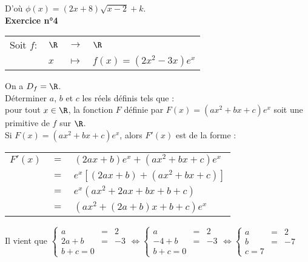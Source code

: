 \vspace*{.3cm}

D'où $\phi\left(x\right) = \left(2x+8\right)\sqrt{x-2} + k$. \\



\textbf{Exercice n°4} \\

\begin{tabular}{llll}
\hspace*{-.3cm} Soit $f:$ & $\R$ & $\longrightarrow$ & $\R$ \\
& $x$ & $\longmapsto$ & $f(x) = \left(2x^2-3x\right)e^x$ \\
\end{tabular}

\vspace*{.3cm}

On a $D_f = \R$. \\

Déterminer $a$, $b$ et $c$ les réels définis tels que : \\ pour tout $x \in \R$, la fonction $F$ définie par $F(x) = \left(ax^2+bx + c\right)e^x$ soit une primitive de $f$ sur $\R$. \\

Si $F(x) = \left(ax^2+bx + c\right)e^x$, alors $F'(x)$ est de la forme : \\

\begin{tabular}{lll}
\hspace*{-.3cm} $F'(x)$ & $=$ & $\left(2ax+b\right)e^x + \left(ax^2 + bx + c\right)e^x$ \vspace*{.3cm} \\
& $=$ & $e^x\left[\left(2ax + b\right) + \left(ax^2 + bx + c\right)\right]$ \vspace*{.3cm} \\
& $=$ & $e^x\left(ax^2 + 2ax + bx + b + c\right)$ \vspace*{.3cm} \\
& $=$ & $\left(ax^2 + \left(2a +b\right)x + b + c\right)e^x$ \\
\end{tabular}

\vspace*{.3cm}

Il vient que $\left\{
  \begin{array}{rll}
    a & = & 2 \\
    2a + b & = & -3 \\
    b + c = 0
  \end{array}
\right. \Longleftrightarrow \left\{
  \begin{array}{rll}
    a & = & 2 \\
    -4 + b & = & -3 \\
    b + c = 0
  \end{array}
\right. \Longleftrightarrow \left\{
  \begin{array}{rll}
    a & = & 2 \\
    b & = & -7 \\
    c = 7
  \end{array}
\right.$ \\

